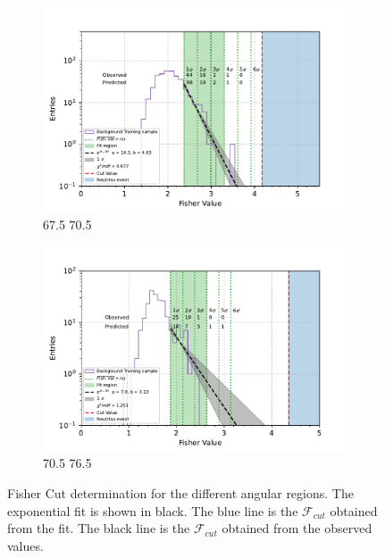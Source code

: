 \begin{figure}[h!]
    \begin{subfigure}[r]{.48\textwidth}
      \centering
      \includegraphics[width=\linewidth]{thesis_figures/Nu_analysis/Fisher_plots/Fisher_fit_region_67.5_70.5.pdf}
      \caption{67.5 70.5}
    \end{subfigure}
    \hfill    
    \begin{subfigure}[r]{.48\textwidth}
      \centering
      \includegraphics[width=\linewidth]{thesis_figures/Nu_analysis/Fisher_plots/Fisher_fit_region_70.5_73.5.pdf}
      \caption{70.5 76.5}
   \end{subfigure}
   \caption{Fisher Cut determination for the different angular regions. The exponential fit is shown in black. The blue line is the $\mathcal{F}_{cut}$ obtained from the fit. The black line is the $\mathcal{F}_{cut}$ obtained from the observed values.}
    \label{fig:Fisher_cut}

\end{figure}

